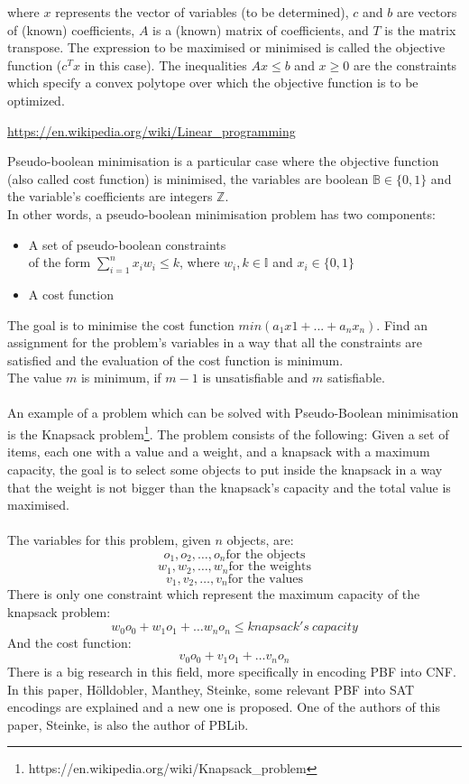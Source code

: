 where $x$ represents the vector of variables (to be determined), $c$ and $b$ are vectors of (known) coefficients, $A$ is a (known) matrix of coefficients, and $T$ is the matrix transpose. The expression to be maximised or minimised is called the objective function ($c^Tx$ in this case). The inequalities $Ax \leq b $ and $x \geq 0$ are the constraints which specify a convex polytope over which the objective function is to be optimized.
\begin{center}
	\href{https://en.wikipedia.org/wiki/Linear\_programming}{https://en.wikipedia.org/wiki/Linear\_programming}
\end{center}
\noindent\makebox[\linewidth]{\rule{\linewidth}{0.4pt}}
Pseudo-boolean minimisation is a particular case where the objective function (also called cost function) is minimised, the variables are boolean $\mathbb{B} \in \{0,1\}$ and the variable’s coefficients are integers $\mathbb{Z}$.  \\
In other words, a pseudo-boolean minimisation problem has two components: 
\begin{itemize}
	\item A set of pseudo-boolean constraints \\
	of the form $\sum_{i=1}^{n} x_{i}w_{i} \leq k$, where $w_{i},k \in \mathbb{I}$ and $x_{i} \in \{0,1\}$
	\item A cost function
\end{itemize}
The goal is to minimise the cost function $min(a_{1}x{1} + ... + a_{n}x_{n})$. Find an assignment for the problem’s variables in a way that all the constraints are satisfied and the evaluation of the cost function is minimum.  \\
The value $m$ is minimum, if $m-1$ is unsatisfiable and $m$ satisfiable.  \\\\
An example of a problem which can be solved with Pseudo-Boolean minimisation is the Knapsack problem\footnote{https://en.wikipedia.org/wiki/Knapsack\_problem}.
The problem consists of the following: Given a set of items, each one with a value and a weight, and a knapsack with a maximum capacity, the goal is to select some objects to put inside the knapsack in a way that the weight is not bigger than the knapsack's capacity and the total value is maximised. \\\\
The variables for this problem, given $n$ objects, are:
$$o_1, o_2, \ldots , o_n \text{for the objects}$$
$$w_1, w_2, \ldots , w_n \text{for the weights}$$
$$v_1, v_2, \ldots , v_n \text{for the values}$$
There is only one constraint which represent the maximum capacity of the knapsack problem:
$$w_0 o_0 + w_1 o_1+  \ldots w_n o_n \leq knapsack's \ capacity$$
And the cost function:
$$v_0 o_0 + v_1 o_1+  \ldots v_n o_n $$
There is a big research in this field, more specifically in encoding PBF into CNF. In this paper, Hölldobler, Manthey, Steinke\cite{Holldobler}, some relevant PBF into SAT encodings are explained and a new one is proposed. One of the authors of this paper, Steinke, is also the author of PBLib. 
 

